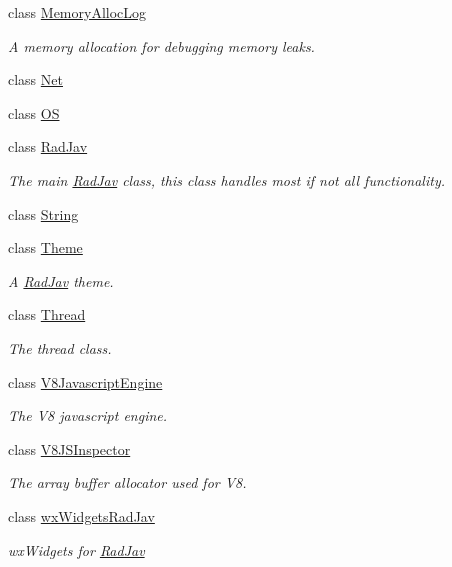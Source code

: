 \begin{DoxyCompactItemize}
class \mbox{\hyperlink{class_rad_j_a_v_1_1_memory_alloc_log}{Memory\+Alloc\+Log}}
\begin{DoxyCompactList}\small\item\em A memory allocation for debugging memory leaks. \end{DoxyCompactList}\item 
class \mbox{\hyperlink{class_rad_j_a_v_1_1_net}{Net}}
\item 
class \mbox{\hyperlink{class_rad_j_a_v_1_1_o_s}{OS}}
\item 
class \mbox{\hyperlink{class_rad_j_a_v_1_1_rad_jav}{Rad\+Jav}}
\begin{DoxyCompactList}\small\item\em The main \mbox{\hyperlink{class_rad_j_a_v_1_1_rad_jav}{Rad\+Jav}} class, this class handles most if not all functionality. \end{DoxyCompactList}\item 
class \mbox{\hyperlink{class_rad_j_a_v_1_1_string}{String}}
\item 
class \mbox{\hyperlink{class_rad_j_a_v_1_1_theme}{Theme}}
\begin{DoxyCompactList}\small\item\em A \mbox{\hyperlink{class_rad_j_a_v_1_1_rad_jav}{Rad\+Jav}} theme. \end{DoxyCompactList}\item 
class \mbox{\hyperlink{class_rad_j_a_v_1_1_thread}{Thread}}
\begin{DoxyCompactList}\small\item\em The thread class. \end{DoxyCompactList}\item 
class \mbox{\hyperlink{class_rad_j_a_v_1_1_v8_javascript_engine}{V8\+Javascript\+Engine}}
\begin{DoxyCompactList}\small\item\em The V8 javascript engine. \end{DoxyCompactList}\item 
class \mbox{\hyperlink{class_rad_j_a_v_1_1_v8_j_s_inspector}{V8\+J\+S\+Inspector}}
\begin{DoxyCompactList}\small\item\em The array buffer allocator used for V8. \end{DoxyCompactList}\item 
class \mbox{\hyperlink{class_rad_j_a_v_1_1wx_widgets_rad_jav}{wx\+Widgets\+Rad\+Jav}}
\begin{DoxyCompactList}\small\item\em wx\+Widgets for \mbox{\hyperlink{class_rad_j_a_v_1_1_rad_jav}{Rad\+Jav}} \end{DoxyCompactList}\end{DoxyCompactItemize}
